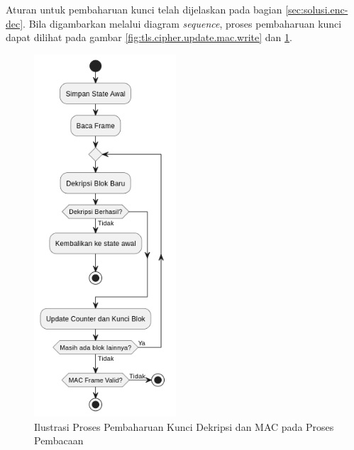 Aturan untuk pembaharuan kunci telah dijelaskan pada bagian \ref{sec:solusi.enc-dec}. Bila digambarkan melalui diagram \emph{sequence}, proses pembaharuan kunci dapat dilihat pada gambar \ref{fig:tls.cipher.update.mac.write} dan \ref{fig:tls.cipher.update.mac.read}.


\begin{figure}[!h]
  \centering
  \includegraphics[width=200px]{chapters/res/chapter-3/img/update.write.png}
  \caption{Ilustrasi Proses Pembaharuan Kunci Dekripsi dan MAC pada Proses Pembacaan} \label{fig:tls.cipher.update.mac.read}
\end{figure}

